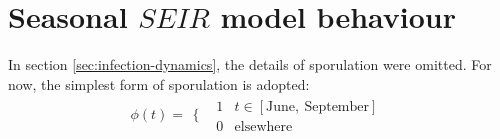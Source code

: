 
\section{Seasonal $SEIR$ model behaviour}

In section \ref{sec:infection-dynamics}, the details of sporulation were omitted. For now, the simplest form of sporulation is adopted:
\begin{equation}
\phi(t) = 
\begin{array}{cc}
  \{ & 
    \begin{array}{cc}
      1 & t\in [\mathrm{June},\ \mathrm{September}] \\
      0 &  \mathrm{elsewhere}
    \end{array}
\end{array}
\end{equation}

